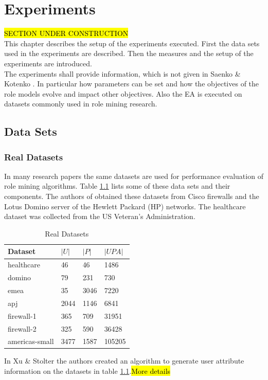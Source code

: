 \newpage
\chapter{Experiments}
\label{sec:experiments}
\hl{SECTION UNDER CONSTRUCTION}\\
This chapter describes the setup of the experiments executed. First the data sets used in the experiments are described. Then the measures and the setup of the experiments are introduced.\\
The experiments shall provide information, which is not given in Saenko \& Kotenko \cite{saenko2012design}. In particular how parameters can be set and how the objectives of the role models evolve and impact other objectives. Also the EA is executed on datasets commonly used in role mining research.

\section{Data Sets}
\subsection{Real Datasets}
In many research papers the same datasets are used for performance evaluation of role mining algorithms. Table \ref{tab:realDatasets} lists some of these data sets and their components. The authors of \cite{Ene} obtained these datasets from Cisco firewalls and the Lotus Domino server of the Hewlett Packard (HP) networks. The healthcare dataset was collected from the US Veteran’s Administration.
\begin{table}[H]
    \centering
    \begin{tabular}{|l|l|l|l|}
        \hline
        \rowcolor{myGray} 
        \textbf{Dataset} & \textbf{$|U|$} & \textbf{$|P|$} & \textbf{$|UPA|$} \\ \hline
        healthcare       & 46             & 46                   & 1486                                 \\ \hline
        domino           & 79             & 231                  & 730                                  \\ \hline
        emea             & 35             & 3046                 & 7220                                 \\ \hline
        apj              & 2044           & 1146                 & 6841                                 \\ \hline
        firewall-1       & 365            & 709                  & 31951                                \\ \hline
        firewall-2       & 325            & 590                  & 36428                                \\ \hline
        americas-small   & 3477           & 1587                 & 105205                               \\ \hline
    \end{tabular}
    \caption{Real Datasets}
    \label{tab:realDatasets}
\end{table}
In Xu \& Stolter\cite{Xu} the authors created an algorithm to generate user attribute information on the datasets in table \ref{tab:realDatasets}.\hl{More details}

